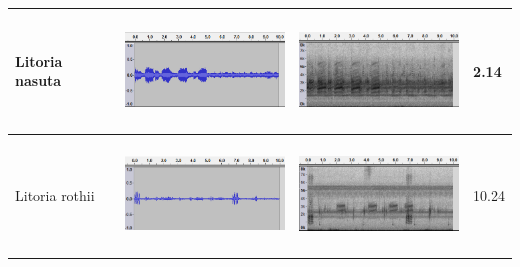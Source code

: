 \begin{table}[htb!]
{\begin{tabular}{llll}
Litoria nasuta              &   \begin{minipage}{.3\textwidth} \includegraphics[width=45mm, height=30mm]{image/Ch1/nasuta_jcu_wav.png}  \end{minipage}       &  \begin{minipage}{.3\textwidth} \includegraphics[width=45mm, height=30mm]{image/Ch1/nasuta_jcu_spec.png}  \end{minipage}           & 2.14     \\ \hline
Litoria rothii              &   \begin{minipage}{.3\textwidth} \includegraphics[width=45mm, height=30mm]{image/Ch1/rothii_jcu_wav.png}  \end{minipage}       &    \begin{minipage}{.3\textwidth} \includegraphics[width=45mm, height=30mm]{image/Ch1/rothii_jcu_spec.png}  \end{minipage}         & 10.24    \\ \hline

\end{tabular}}
\end{table}
